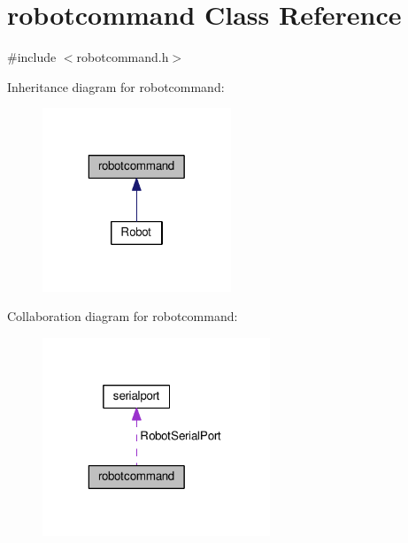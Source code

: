 \hypertarget{classrobotcommand}{\section{robotcommand Class Reference}
\label{classrobotcommand}
}


{\ttfamily \#include $<$robotcommand.\-h$>$}



Inheritance diagram for robotcommand\-:
\nopagebreak
\begin{figure}[H]
\begin{center}
\leavevmode
\includegraphics[width=160pt]{classrobotcommand__inherit__graph}
\end{center}
\end{figure}


Collaboration diagram for robotcommand\-:
\nopagebreak
\begin{figure}[H]
\begin{center}
\leavevmode
\includegraphics[width=193pt]{classrobotcommand__coll__graph}
\end{center}
\end{figure}
